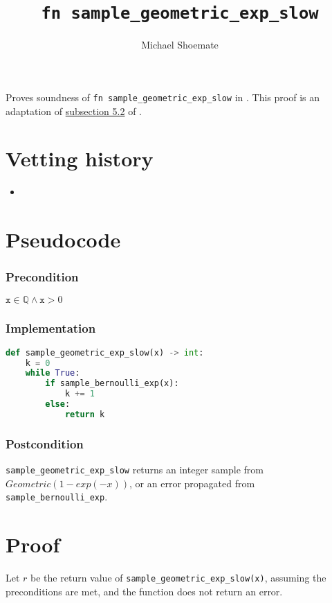 \documentclass{article}
\title{\texttt{fn sample\_geometric\_exp\_slow}}
\author{Michael Shoemate}
\begin{document}
\maketitle

\contrib
Proves soundness of \texttt{fn sample\_geometric\_exp\_slow} in .
This proof is an adaptation of \href{https://arxiv.org/pdf/2004.00010.pdf#subsection.5.2}{subsection 5.2} of \cite{CKS20}.

\section{Vetting history}
\begin{itemize}
    \item {}
\end{itemize}

\section{Pseudocode}
\subsubsection*{Precondition}
$\texttt{x} \in \mathbb{Q} \land \texttt{x} > 0$

\subsubsection*{Implementation}        
\begin{lstlisting}[language=Python]
def sample_geometric_exp_slow(x) -> int:
    k = 0
    while True:
        if sample_bernoulli_exp(x):
            k += 1
        else:
            return k
\end{lstlisting}

\subsubsection*{Postcondition}
\texttt{sample\_geometric\_exp\_slow} returns an integer sample from $Geometric(1 - exp(-x))$, or an error propagated from \texttt{sample\_bernoulli\_exp}.

\section{Proof}
Let $r$ be the return value of \texttt{sample\_geometric\_exp\_slow(x)}, assuming the preconditions are met, and the function does not return an error.
\end{document}
